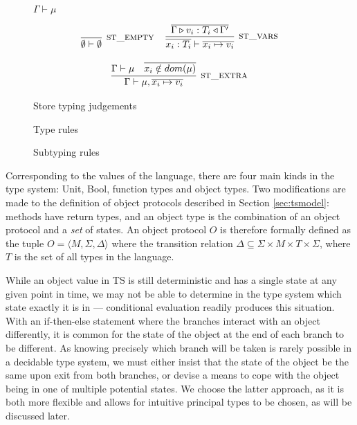 \documentclass[preprint]{sigplanconf}
\newcommand{\secref}[1]{Section \ref{#1}}
\newcommand{\typerule}[4]{#1 \triangleright #2 : #3 \triangleleft #4}
\begin{document}
\begin{figure}
\begin{ottdefnblock}
{$\Gamma  \vdash  \mu$}
{}
\end{ottdefnblock}

\[
\begin{tabular}{cc}
\infer[\textsc{st\_empty}]
{\emptyset \vdash \emptyset}
{}
&
\infer[\textsc{st\_vars}]
{\overline{x_i : T_i} \vdash \overline{x_i \mapsto v_i}}
{\overline{\typerule{\Gamma}{v_i}{T_i}{\Gamma'}}}
\\\\
\multicolumn{2}{c}{
\infer[\textsc{st\_extra}]
{\Gamma \vdash \mu, \overline{x_i \mapsto v_i}}
{\Gamma \vdash \mu & \overline{x_i \notin dom(\mu)}}
}
\end{tabular}
\]

\caption{\label{fig:storetype} Store typing judgements}
\end{figure}

\begin{figure}
\ottdefnmethtype

\ottdefntype

\caption{\label{fig:typerules} Type rules}
\end{figure}

\begin{figure}

\ottdefnsubtype

\caption{\label{fig:subtyperules} Subtyping rules}
\end{figure}

Corresponding to the values of the language, there are four main kinds
in the type system: Unit, Bool, function types and object types. 
Two modifications are made to the definition of object protocols described
in \secref{sec:tsmodel}: methods have return types, and an object type
is the combination of an object protocol and a {\it set} of states.
An object protocol $O$ is therefore formally defined as the tuple 
$O = \langle M, \Sigma, \Delta \rangle$
where the transition relation $\Delta \subseteq \Sigma \times M \times T \times \Sigma$, 
where $T$ is the set of all types in the language.

While an object value in TS is still deterministic and has a single state at any 
given
point in time, we may not be able to determine in the type system which state 
exactly it is in --- conditional evaluation readily produces this situation.
With an if-then-else statement where the branches
interact with an object differently, it is common for the state of the object
at the end of each branch to be different. As
knowing precisely which branch will be taken is rarely possible in a
decidable type system, we must either insist that the state of the object
be the same upon exit from both branches, or devise a means to cope with
the object being in one of multiple potential states. We choose the latter
approach, as it is both more flexible and allows for intuitive principal
types to be chosen, as will be discussed later.
\end{document}
